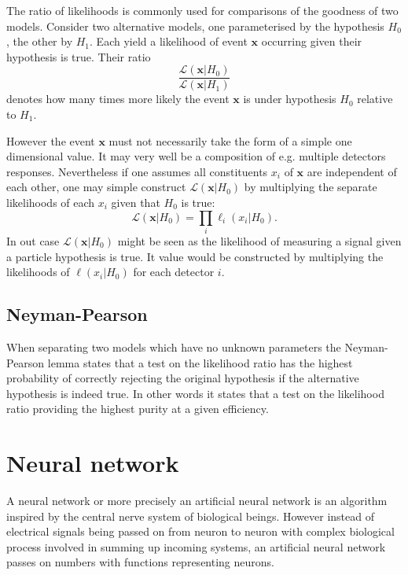 The ratio of likelihoods is commonly used for comparisons of the goodness of two models. Consider two alternative models, one parameterised by the hypothesis $H_0$, the other by $H_1$. Each yield a likelihood of event $\pmb{x}$ occurring given their hypothesis is true. Their ratio
\begin{equation*}
	\frac{\mathcal{L}(\pmb{x}|H_0)}{\mathcal{L}(\pmb{x}|H_1)}
\end{equation*} denotes how many times more likely the event $\pmb{x}$ is under hypothesis $H_0$ relative to $H_1$.

However the event $\pmb{x}$ must not necessarily take the form of a simple one dimensional value. It may very well be a composition of e.g. multiple detectors responses. Nevertheless if one assumes all constituents $x_i$ of $\pmb{x}$ are independent of each other, one may simple construct $\mathcal{L}(\pmb{x}|H_0)$ by multiplying the separate likelihoods of each $x_i$ given that $H_0$ is true:
\begin{equation*}
	\mathcal{L}(\pmb{x}|H_0) = \prod \limits_{i} \ell_i(x_i|H_0).
\end{equation*}
In out case $\mathcal{L}(\pmb{x}|H_0)$ might be seen as the likelihood of measuring a signal given a particle hypothesis is true. It value would be constructed by multiplying the likelihoods of $\ell(x_i|H_0)$ for each detector $i$.

\subsection{Neyman-Pearson}
\label{subsec:likelihood_ratios_neyman_pearson}

When separating two models which have no unknown parameters the Neyman-Pearson lemma states that a test on the likelihood ratio has the highest probability of correctly rejecting the original hypothesis if the alternative hypothesis is indeed true. In other words it states that a test on the likelihood ratio providing the highest purity at a given efficiency.

\section{Neural network}
\label{sec:neural_network}

A neural network or more precisely an artificial neural network is an algorithm inspired by the central nerve system of biological beings. However instead of electrical signals being passed on from neuron to neuron with complex biological process involved in summing up incoming systems, an artificial neural network passes on numbers with functions representing neurons.

